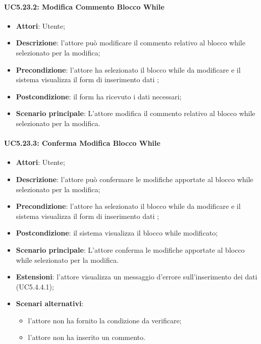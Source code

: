 \paragraph{UC5.23.2: Modifica Commento Blocco While}
\label{UC5.23.2}
\begin{itemize}
	\item \textbf{Attori}: Utente;
	\item \textbf{Descrizione}: l'attore può modificare il commento relativo al blocco while selezionato per la modifica;
	\item \textbf{Precondizione}: l'attore ha selezionato il blocco while da modificare e il sistema visualizza il form di inserimento dati ;
	\item \textbf{Postcondizione}: il form ha ricevuto i dati necessari;
	\item \textbf{Scenario principale}: L'attore modifica il commento relativo al blocco while selezionato per la modifica.
\end{itemize}

\paragraph{UC5.23.3: Conferma Modifica Blocco While}
\label{UC5.23.3}
\begin{itemize}
	\item \textbf{Attori}: Utente;
	\item \textbf{Descrizione}: l'attore può confermare le modifiche apportate al blocco while selezionato per la modifica;
	\item \textbf{Precondizione}: l'attore ha selezionato il blocco while da modificare e il sistema visualizza il form di inserimento dati ;
	\item \textbf{Postcondizione}: il sistema visualizza il blocco while modificato;
	\item \textbf{Scenario principale}: L'attore conferma le modifiche apportate al blocco while selezionato per la modifica.
	\item \textbf{Estensioni}: l'attore visualizza un messaggio d'errore sull'inserimento dei dati (UC5.4.4.1);
	\item \textbf{Scenari alternativi}:
	\begin{itemize}
		\item l'attore non ha fornito la condizione da verificare;
		\item l'attore non ha inserito un commento.
	\end{itemize}
\end{itemize}

